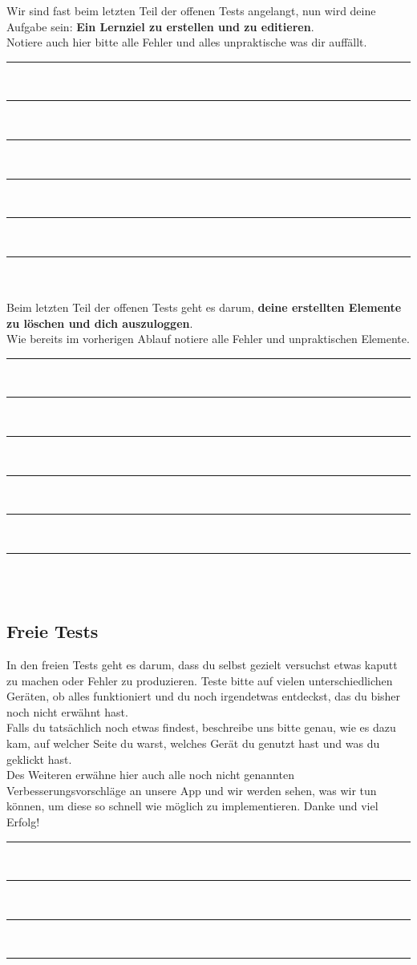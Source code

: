 Wir sind fast beim letzten Teil der offenen Tests angelangt, nun wird deine Aufgabe sein: \textbf{Ein Lernziel zu erstellen und zu editieren}.\\
Notiere auch hier bitte alle Fehler und alles unpraktische was dir auffällt.\\
\noindent\rule{\textwidth}{0.4pt}\\
\noindent\rule{\textwidth}{0.4pt}\\
\noindent\rule{\textwidth}{0.4pt}\\
\noindent\rule{\textwidth}{0.4pt}\\
\noindent\rule{\textwidth}{0.4pt}\\
\noindent\rule{\textwidth}{0.4pt}\\\\
Beim letzten Teil der offenen Tests geht es darum, \textbf{deine erstellten Elemente zu löschen und dich auszuloggen}.\\
Wie bereits im vorherigen Ablauf notiere alle Fehler und unpraktischen Elemente.\\
\noindent\rule{\textwidth}{0.4pt}\\
\noindent\rule{\textwidth}{0.4pt}\\
\noindent\rule{\textwidth}{0.4pt}\\
\noindent\rule{\textwidth}{0.4pt}\\
\noindent\rule{\textwidth}{0.4pt}\\
\noindent\rule{\textwidth}{0.4pt}\\\\
\subsection{Freie Tests}
In den freien Tests geht es darum, dass du selbst gezielt versuchst etwas kaputt zu machen oder Fehler zu produzieren. Teste bitte auf vielen unterschiedlichen Geräten, ob alles funktioniert und du noch irgendetwas entdeckst, das du bisher noch nicht erwähnt hast. \\
Falls du tatsächlich noch etwas findest, beschreibe uns bitte genau, wie es dazu kam, auf welcher Seite du warst, welches Gerät du genutzt hast und was du geklickt hast.\\
Des Weiteren erwähne hier auch alle noch nicht genannten Verbesserungsvorschläge an unsere App und wir werden sehen, was wir tun können, um diese so schnell wie möglich zu implementieren. Danke und viel Erfolg!\\
\noindent\rule{\textwidth}{0.4pt}\\ %
\noindent\rule{\textwidth}{0.4pt}\\
\noindent\rule{\textwidth}{0.4pt}\\
\noindent\rule{\textwidth}{0.4pt}\\
